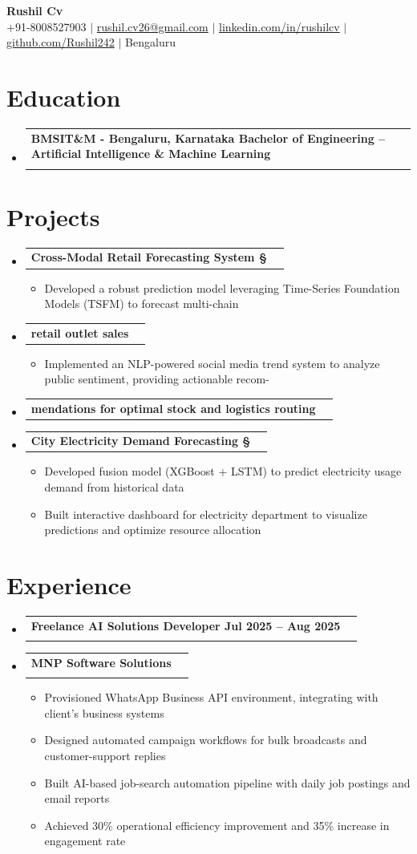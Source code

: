 \documentclass[letterpaper,11pt]{article}
\makeatletter
\newcommand{\resumeItem}[1]{
  \item\small{#1 \vspace{-2pt}}
}
\newcommand{\resumeSubheading}[4]{
  \vspace{-2pt}\item
  \begin{tabular*}{0.97\textwidth}[t]{l@{\extracolsep{\fill}}r}
    \textbf{#1} & #2 \\
    \textit{\small#3} & \textit{\small #4} \\
  \end{tabular*}\vspace{-7pt}
}
\newcommand{\resumeProjectHeading}[2]{
  \item
  \begin{tabular*}{0.97\textwidth}{l@{\extracolsep{\fill}}r}
    \small#1 & #2 \\
  \end{tabular*}\vspace{-7pt}
}
\newcommand{\resumeSubHeadingListStart}{\begin{itemize}[leftmargin=0.15in, label={}]}
\newcommand{\resumeSubHeadingListEnd}{\end{itemize}}
\newcommand{\resumeItemListStart}{\begin{itemize}}
\newcommand{\resumeItemListEnd}{\end{itemize}\vspace{-5pt}}
\makeatother
\begin{document}
\begin{center}
  {\Huge \textbf{Rushil Cv}} \\[4pt]
  \small +91-8008527903 $|$ \href{mailto:rushil.cv26@gmail.com}{rushil.cv26@gmail.com} $|$ \href{linkedin.com/in/rushilcv}{linkedin.com/in/rushilcv} $|$ \href{github.com/Rushil242}{github.com/Rushil242} $|$ Bengaluru
\end{center}

\section{Education}
\resumeSubHeadingListStart
  \resumeSubheading{BMSIT\&M - Bengaluru, Karnataka Bachelor of Engineering – Artificial Intelligence \& Machine Learning}{}{}{}
\resumeSubHeadingListEnd

\section{Projects}
\resumeSubHeadingListStart
  \resumeProjectHeading{\textbf{Cross-Modal Retail Forecasting System §}}{}
  \resumeItemListStart
    \resumeItem{Developed a robust prediction model leveraging Time-Series Foundation Models (TSFM) to forecast multi-chain}
  \resumeItemListEnd
  \resumeProjectHeading{\textbf{retail outlet sales}}{}
  \resumeItemListStart
    \resumeItem{Implemented an NLP-powered social media trend system to analyze public sentiment, providing actionable recom-}
  \resumeItemListEnd
  \resumeProjectHeading{\textbf{mendations for optimal stock and logistics routing}}{}
  \resumeProjectHeading{\textbf{City Electricity Demand Forecasting §}}{}
  \resumeItemListStart
    \resumeItem{Developed fusion model (XGBoost + LSTM) to predict electricity usage demand from historical data}
    \resumeItem{Built interactive dashboard for electricity department to visualize predictions and optimize resource allocation}
  \resumeItemListEnd
\resumeSubHeadingListEnd

\section{Experience}
\resumeSubHeadingListStart
  \resumeSubheading{Freelance AI Solutions Developer Jul 2025 – Aug 2025}{}{}{}
  \resumeSubheading{MNP Software Solutions}{}{}{}
  \resumeItemListStart
    \resumeItem{Provisioned WhatsApp Business API environment, integrating with client’s business systems}
    \resumeItem{Designed automated campaign workflows for bulk broadcasts and customer-support replies}
    \resumeItem{Built AI-based job-search automation pipeline with daily job postings and email reports}
    \resumeItem{Achieved 30\% operational efficiency improvement and 35\% increase in engagement rate}
  \resumeItemListEnd
\resumeSubHeadingListEnd
\end{document}

